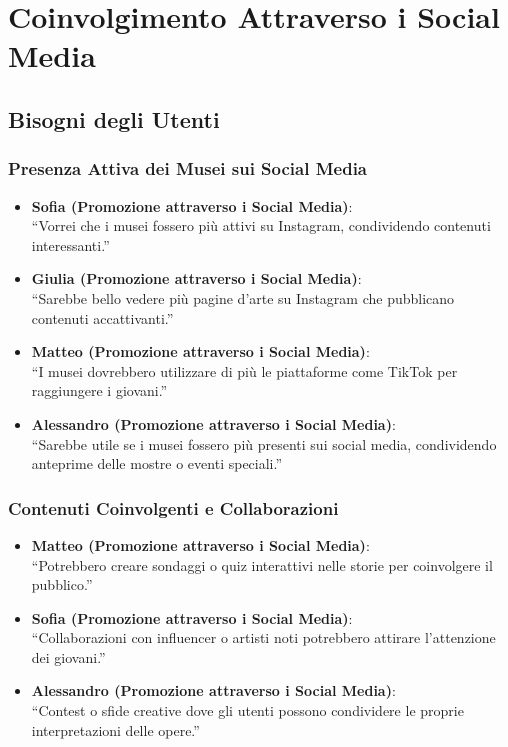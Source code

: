 \documentclass{article}
\begin{document}
\section{Coinvolgimento Attraverso i Social Media}

\subsection{Bisogni degli Utenti}

\subsubsection{Presenza Attiva dei Musei sui Social Media}

\begin{itemize}
    \item \textbf{Sofia (Promozione attraverso i Social Media)}:\\
    ``Vorrei che i musei fossero più attivi su Instagram, condividendo contenuti interessanti.''
    \item \textbf{Giulia (Promozione attraverso i Social Media)}:\\
    ``Sarebbe bello vedere più pagine d'arte su Instagram che pubblicano contenuti accattivanti.''
    \item \textbf{Matteo (Promozione attraverso i Social Media)}:\\
    ``I musei dovrebbero utilizzare di più le piattaforme come TikTok per raggiungere i giovani.''
    \item \textbf{Alessandro (Promozione attraverso i Social Media)}:\\
    ``Sarebbe utile se i musei fossero più presenti sui social media, condividendo anteprime delle mostre o eventi speciali.''
\end{itemize}

\subsubsection{Contenuti Coinvolgenti e Collaborazioni}

\begin{itemize}
    \item \textbf{Matteo (Promozione attraverso i Social Media)}:\\
    ``Potrebbero creare sondaggi o quiz interattivi nelle storie per coinvolgere il pubblico.''
    \item \textbf{Sofia (Promozione attraverso i Social Media)}:\\
    ``Collaborazioni con influencer o artisti noti potrebbero attirare l'attenzione dei giovani.''
    \item \textbf{Alessandro (Promozione attraverso i Social Media)}:\\
    ``Contest o sfide creative dove gli utenti possono condividere le proprie interpretazioni delle opere.''
\end{itemize}
\end{document}
